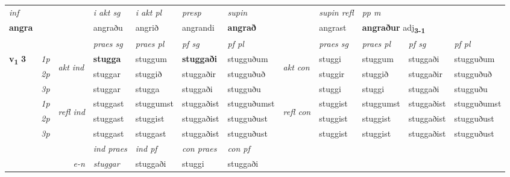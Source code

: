 \begin{longtable}[l]{X>{\footnotesize\itshape}llXXXXlXXXX}
   {\textit{inf}} & &  & \textit{i akt sg} & \textit{i akt pl}   & \textit{presp} & \textit{supin} && \textit{supin refl} & \textit{pp m} \\*
  {\textbf{angra}} & && angraðu  & angrið   & angrandi &  \textbf{angrað} && angrast & \multicolumn{2}{l}{\textbf{angraður} adj\textbf{\textsubscript{3-1}}} \\*

\midrule

 & &   & \textit{praes sg}  & \textit{praes pl}    & \textit{ pf sg} & \textit{pf pl} & & \textit{praes sg}  & \textit{praes pl}    & \textit{pf sg} & \textit{pf pl }  \\ \cmidrule{4-7} \cmidrule{9-12}
 \multirow{2}{*}{{{\textbf{v{\textsubscript{1}}} \Large{\textbf{3}}}}}  & 1p & \multirow{3}{*}{\begin{turn}{90}\textit{akt ind}\end{turn}} & \textbf{stugga} & stuggum & \textbf{stuggaði} & stugguðum & \multirow{3}{*}{\begin{turn}{90}\textit{akt con}\end{turn}} &stuggi & stuggum & stuggaði & stugguðum\\*
 & 2p &  &  stuggar  & stuggið & stuggaðir & stugguðuð & & stuggir & stuggið & stuggaðir & stugguðuð \\*
 & 3p &  & stuggar & stugga & stuggaði & stugguðu & & stuggi & stuggi& stuggaði & stugguðu \\*
\cmidrule{4-7} \cmidrule{9-12}
 & 1p & \multirow{3}{*}{\begin{turn}{90}\textit{refl ind}\end{turn}}  & stuggast & stuggumst & stuggaðist & stugguðumst & \multirow{3}{*}{\begin{turn}{90}\textit{refl con}\end{turn}}  &stuggist & stuggumst & stuggaðist & stugguðumst \\*
 & 2p &  & stuggast & stuggist & stuggaðist & stugguðust & &stuggist & stuggist & stuggaðist & stugguðust \\*
 & 3p  & & stuggast & stuggast & stuggaðist & stugguðust & & stuggist & stuggist& stuggaðist & stugguðust \\*
\cmidrule{4-7} \cmidrule{9-12}

   && &  \textit{ind praes} & \textit{ind pf} & \textit{con praes} & \textit{con pf} \\*
\multicolumn{3}{r}{\textit{e-n}} & stuggar & stuggaði & stuggi & stuggaði \\*


\end{longtable}
